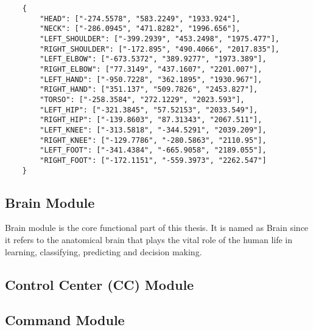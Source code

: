  \begin{lstlisting}
	{
		"HEAD": ["-274.5578", "583.2249", "1933.924"],
		"NECK": ["-286.0945", "471.8282", "1996.656"],
		"LEFT_SHOULDER": ["-399.2939", "453.2498", "1975.477"],
		"RIGHT_SHOULDER": ["-172.895", "490.4066", "2017.835"],
		"LEFT_ELBOW": ["-673.5372", "389.9277", "1973.389"],
		"RIGHT_ELBOW": ["77.3149", "437.1607", "2201.007"],
		"LEFT_HAND": ["-950.7228", "362.1895", "1930.967"],
		"RIGHT_HAND": ["351.137", "509.7826", "2453.827"],
		"TORSO": ["-258.3584", "272.1229", "2023.593"],
		"LEFT_HIP": ["-321.3845", "57.52153", "2033.549"],
		"RIGHT_HIP": ["-139.8603", "87.31343", "2067.511"],
		"LEFT_KNEE": ["-313.5818", "-344.5291", "2039.209"],
		"RIGHT_KNEE": ["-129.7786", "-280.5863", "2110.95"],
		"LEFT_FOOT": ["-341.4384", "-665.9058", "2189.055"],
		"RIGHT_FOOT": ["-172.1151", "-559.3973", "2262.547"]
	}
 \end{lstlisting}
 \label{code:skeleton:data}
 
\subsection{Brain Module} Brain module is the core functional part of this thesis. It is named as Brain since it refers to the anatomical brain that plays the vital role of the human life in learning, classifying, predicting and decision making. 



\subsection{Control Center (CC) Module}

\subsection{Command Module} 
